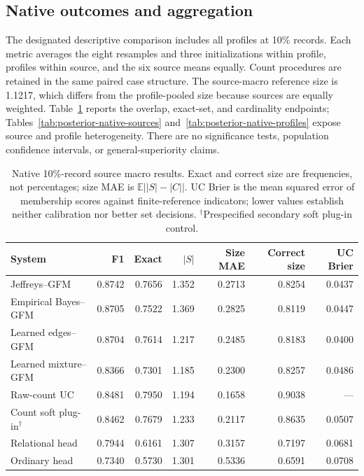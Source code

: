 \subsection{Native outcomes and aggregation}
The designated descriptive comparison includes all profiles at 10\% records. Each metric averages the eight resamples and three initializations within profile, profiles within source, and the six source means equally. Count procedures are retained in the same paired case structure. The source-macro reference size is 1.1217, which differs from the profile-pooled size because sources are equally weighted. Table~\ref{tab:posterior-native-full} reports the overlap, exact-set, and cardinality endpoints; Tables~\ref{tab:posterior-native-sources} and~\ref{tab:posterior-native-profiles} expose source and profile heterogeneity. There are no significance tests, population confidence intervals, or general-superiority claims.
\begin{table}[ht]\centering\footnotesize
\begin{tabular*}{\linewidth}{@{\extracolsep{\fill}}lrrrrrr@{}}\toprule
System & F1 & Exact & $|S|$ & Size MAE & Correct size & UC Brier\\\midrule
Jeffreys--GFM & 0.8742 & 0.7656 & 1.352 & 0.2713 & 0.8254 & 0.0437\\
Empirical Bayes--GFM & 0.8705 & 0.7522 & 1.369 & 0.2825 & 0.8119 & 0.0447\\
Learned edges--GFM & 0.8704 & 0.7614 & 1.217 & 0.2485 & 0.8183 & 0.0400\\
Learned mixture--GFM & 0.8366 & 0.7301 & 1.185 & 0.2300 & 0.8257 & 0.0486\\
Raw-count UC & 0.8481 & 0.7950 & 1.194 & 0.1658 & 0.9038 & ---\\
Count soft plug-in$^{\dagger}$ & 0.8462 & 0.7679 & 1.233 & 0.2117 & 0.8635 & 0.0507\\
Relational head & 0.7944 & 0.6161 & 1.307 & 0.3157 & 0.7197 & 0.0681\\
Ordinary head & 0.7340 & 0.5730 & 1.301 & 0.5336 & 0.6591 & 0.0708\\
\bottomrule\end{tabular*}
\caption{Native 10\%-record source macro results. Exact and correct size are frequencies, not percentages; size MAE is $\mathbb E\lvert |S|-|C|\rvert$. UC Brier is the mean squared error of membership scores against finite-reference indicators; lower values establish neither calibration nor better set decisions. $^{\dagger}$Prespecified secondary soft plug-in control.}\label{tab:posterior-native-full}\end{table}

